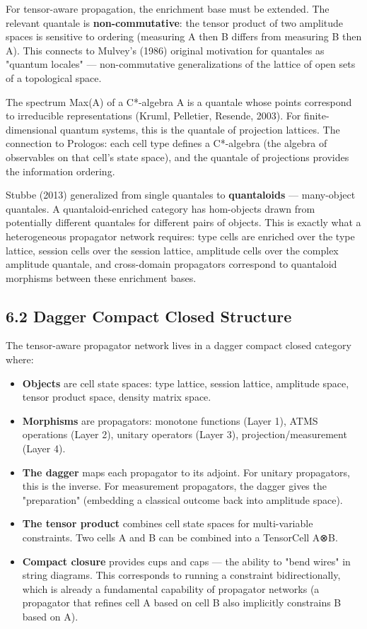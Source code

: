 \documentclass[11pt]{article}
\begin{document}
For tensor-aware propagation, the enrichment base must be extended. The relevant
quantale is \textbf{non-commutative}: the tensor product of two amplitude spaces is
sensitive to ordering (measuring A then B differs from measuring B then A). This
connects to Mulvey's (1986) original motivation for quantales as "quantum locales"
--- non-commutative generalizations of the lattice of open sets of a topological
space.

The spectrum Max(A) of a C*-algebra A is a quantale whose points correspond to
irreducible representations (Kruml, Pelletier, Resende, 2003). For
finite-dimensional quantum systems, this is the quantale of projection lattices.
The connection to Prologos: each cell type defines a C*-algebra (the algebra of
observables on that cell's state space), and the quantale of projections provides
the information ordering.

Stubbe (2013) generalized from single quantales to \textbf{quantaloids} --- many-object
quantales. A quantaloid-enriched category has hom-objects drawn from potentially
different quantales for different pairs of objects. This is exactly what a
heterogeneous propagator network requires: type cells are enriched over the type
lattice, session cells over the session lattice, amplitude cells over the complex
amplitude quantale, and cross-domain propagators correspond to quantaloid
morphisms between these enrichment bases.
\subsection{6.2 Dagger Compact Closed Structure}
\label{sec:org0b6d65c}

The tensor-aware propagator network lives in a dagger compact closed category
where:

\begin{itemize}
\item \textbf{Objects} are cell state spaces: type lattice, session lattice, amplitude
space, tensor product space, density matrix space.
\item \textbf{Morphisms} are propagators: monotone functions (Layer 1), ATMS operations
(Layer 2), unitary operators (Layer 3), projection/measurement (Layer 4).
\item \textbf{The dagger} maps each propagator to its adjoint. For unitary propagators,
this is the inverse. For measurement propagators, the dagger gives the
"preparation" (embedding a classical outcome back into amplitude space).
\item \textbf{The tensor product} combines cell state spaces for multi-variable constraints.
Two cells A and B can be combined into a TensorCell A⊗B.
\item \textbf{Compact closure} provides cups and caps --- the ability to "bend wires" in
string diagrams. This corresponds to running a constraint bidirectionally,
which is already a fundamental capability of propagator networks (a propagator
that refines cell A based on cell B also implicitly constrains B based on A).
\end{itemize}
\end{document}
